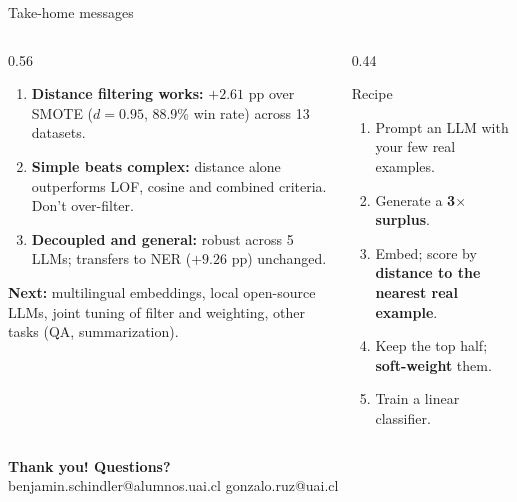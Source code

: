 \begin{frame}[t]{Take-home messages}
\vspace{0.3em}
\begin{columns}[T]
\begin{column}{0.56\textwidth}
\small
\begin{enumerate}\setlength\itemsep{2pt}
  \item \textbf{Distance filtering works:} $+2.61$ pp over SMOTE
        ($d=0.95$, 88.9\% win rate) across 13 datasets.
  \item \textbf{Simple beats complex:} distance alone outperforms LOF, cosine and
        combined criteria. Don't over-filter.
  \item \textbf{Decoupled and general:} robust across 5 LLMs;
        transfers to NER ($+9.26$ pp) unchanged.
\end{enumerate}

\vspace{0.2em}
{\scriptsize\textbf{Next:} multilingual embeddings, local open-source LLMs,
joint tuning of filter and weighting, other tasks (QA, summarization).}
\end{column}
\begin{column}{0.44\textwidth}
\begin{block}{Recipe}
\footnotesize
\begin{enumerate}\setlength\itemsep{1pt}
  \item Prompt an LLM with your few real examples.
  \item Generate a \textbf{3$\times$ surplus}.
  \item Embed; score by \textbf{distance to the nearest real example}.
  \item Keep the top half; \textbf{soft-weight} them.
  \item Train a linear classifier.
\end{enumerate}
\end{block}
\end{column}
\end{columns}

\vfill
\begin{center}
\begin{tcolorbox}[colback=uaibluedark, colframe=uaibluedark, coltext=white,
                  width=0.8\linewidth, halign=center, arc=4pt,
                  top=2pt, bottom=2pt]
\textbf{Thank you! Questions?}\\[2pt]
{\scriptsize benjamin.schindler@alumnos.uai.cl \textperiodcentered{} gonzalo.ruz@uai.cl}
\end{tcolorbox}
\end{center}
\end{frame}
